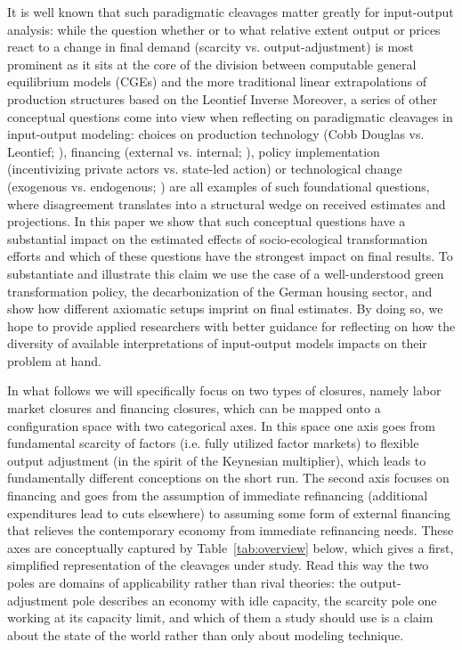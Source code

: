 It is well known that such paradigmatic cleavages matter greatly for input-output analysis: while the question whether or to what relative extent output or prices react to a change in final demand (scarcity vs. output-adjustment) is most prominent as it sits at the core of the division between computable general equilibrium models (CGEs) and the more traditional linear extrapolations of production structures based on the Leontief Inverse \citep{Leontief.1936, BlairMiller} Moreover, a series of other conceptual questions come into view when reflecting on paradigmatic cleavages in input-output modeling: choices on production technology (Cobb Douglas vs. Leontief; \citealp{Labini.1995, Klump.2012, Leontief.1936}), financing (external vs. internal; \citealp{BlinderSolow.1973, Hein.2023}), policy implementation (incentivizing private actors vs. state-led action) or technological change (exogenous vs. endogenous; \citealp{Kaldor1961}) are all examples of such foundational questions, where disagreement translates into a structural wedge on received estimates and projections. In this paper we show that such conceptual questions have a substantial impact on the estimated effects of socio-ecological transformation efforts and which of these questions have the strongest impact on final results. To substantiate and illustrate this claim we use the case of a well-understood green transformation policy, the decarbonization of the German housing sector, and show how different axiomatic setups imprint on final estimates. By doing so, we hope to provide applied researchers with better guidance for reflecting on how the diversity of available interpretations of input-output models impacts on their problem at hand.

In what follows we will specifically focus on two types of closures, namely labor market closures and financing closures, which can be mapped onto a configuration space with two categorical axes.
In this space one axis goes from fundamental scarcity of factors (i.e. fully utilized factor markets) to flexible output adjustment (in the spirit of the Keynesian multiplier), which leads to fundamentally different conceptions on the short run. The second axis focuses on financing and goes from the assumption of immediate refinancing (additional expenditures lead to cuts elsewhere) to assuming some form of external financing that relieves the contemporary economy from immediate refinancing needs. These axes are conceptually captured by Table~\ref{tab:overview} below, which gives a first, simplified representation of the cleavages under study. Read this way the two poles are domains of applicability rather than rival theories: the output-adjustment pole describes an economy with idle capacity, the scarcity pole one working at its capacity limit, and which of them a study should use is a claim about the state of the world rather than only about modeling technique.


